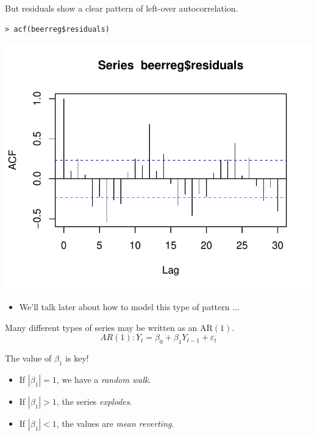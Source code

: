 \documentclass[12pt,xcolor=svgnames]{beamer}
\newcommand{\bl}{\color{blue}}
\newcommand{\nochap}{\vspace{0.5cm}}
\begin{document}
\begin{frame}[fragile]
\nochap

But residuals show a clear pattern of left-over autocorrelation.
{\bl
\begin{verbatim}
> acf(beerreg$residuals)
\end{verbatim}
}

\begin{center} 
\begin{minipage}{7.5cm}
\includegraphics[scale=0.68,trim=15 25 0 20]{acfbeerreg_new}
\end{minipage}
\begin{minipage}{3cm}
\begin{itemize}
\item We'll talk later about how to model this type of pattern ...
\end{itemize}
\end{minipage}
\end{center}

\end{frame}


\begin{frame}
\nochap

Many different types of series may be written as an AR$(1)$.
\[
AR(1): Y_t = \beta_0 + \beta_1Y_{t-1} + \varepsilon_t
\]

{\bl The value of $\beta_1$ is key!}
\begin{itemize}
\item If $|\beta_1| = 1$, we have a {\em random walk}.
\item If $|\beta_1| > 1$, the series {\em explodes}.
\item If $|\beta_1| < 1$, the values are {\em mean reverting}.
\end{itemize}

\end{frame}
\end{document}
